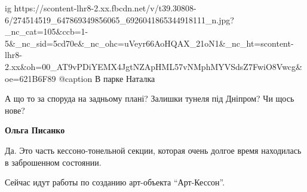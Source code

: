  
 
 
 
 

\ifcmt
  ig https://scontent-lhr8-2.xx.fbcdn.net/v/t39.30808-6/274514519_647869349856065_6926041865344918111_n.jpg?_nc_cat=105&ccb=1-5&_nc_sid=5cd70e&_nc_ohc=uVeyr66AoHQAX_21oN1&_nc_ht=scontent-lhr8-2.xx&oh=00_AT9vPDiYEMX4JgtNZApHML57vNMphMYVSdsZ7FwiO8Vwcg&oe=621B6F89
	@caption В парке Наталка
\fi

А що то за споруда на задньому плані? Залишки тунеля під Дніпром? Чи щось нове?

\textbf{Ольга Писанко} 

Да. Это часть кессоно-тонельной секции, которая очень долгое время находилась в
заброшенном состоянии.

Сейчас идут работы по созданию арт-объекта \enquote{Арт-Кессон}.
